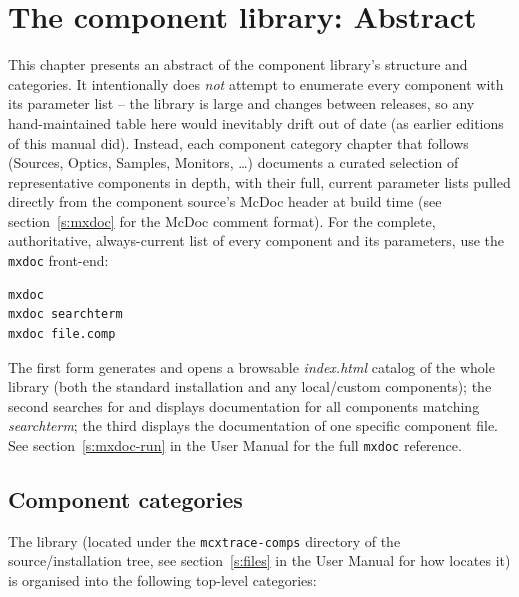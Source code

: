 \chapter{The component library: Abstract}
\label{s:components}

This chapter presents an abstract of the \MCX component library's
structure and categories. It intentionally does \emph{not} attempt to
enumerate every component with its parameter list -- the library is large
and changes between releases, so any hand-maintained table here would
inevitably drift out of date (as earlier editions of this manual did).
Instead, each component category chapter that follows (Sources, Optics,
Samples, Monitors, \ldots) documents a curated selection of representative
components in depth, with their full, current parameter lists pulled
directly from the component source's McDoc header at build time (see
section~\ref{s:mxdoc} for the McDoc comment format). For the complete,
authoritative, always-current list of every component and its parameters,
use the \verb+mxdoc+ front-end:
\begin{lstlisting}
mxdoc
mxdoc searchterm
mxdoc file.comp
\end{lstlisting}
The first form generates and opens a browsable \textit{index.html} catalog
of the whole library (both the standard installation and any local/custom
components); the second searches for and displays documentation for all
components matching \textit{searchterm}; the third displays the
documentation of one specific component file. See
section~\ref{s:mxdoc-run} in the User Manual for the full \verb+mxdoc+
reference.

\section{Component categories}
\label{s:comp-overview}

The library (located under the \verb+mcxtrace-comps+ directory of the
\MCX source/installation tree, see section~\ref{s:files} in the User
Manual for how \MCX locates it) is organised into the following top-level
categories:

